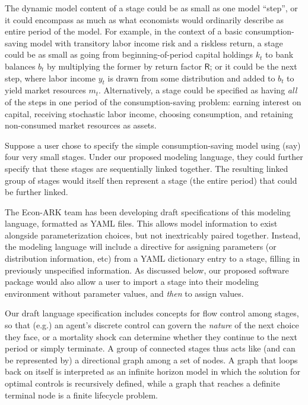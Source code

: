 \documentclass[12pt,pdftex,letterpaper]{article}
\begin{document}
The dynamic model content of a stage could be as small as one model ``step'', or it could encompass as much as what economists would ordinarily describe as entire period of the model. For example, in the context of a basic consumption-saving model with transitory labor income risk and a riskless return, a stage could be as small as going from beginning-of-period capital holdings $k_t$ to bank balances $b_t$ by multiplying the former by return factor $\mathsf{R}$; or it could be the next step, where labor income $y_t$ is drawn from some distribution and added to $b_t$ to yield market resources $m_t$. Alternatively, a stage could be specified as having \textit{all} of the steps in one period of the consumption-saving problem: earning interest on capital, receiving stochastic labor income, choosing consumption, and retaining non-consumed market resources as assets.

Suppose a user chose to specify the simple consumption-saving model using (say) four very small stages. Under our proposed modeling language, they could further specify that these stages are sequentially linked together. The resulting linked group of stages would itself then represent a stage (the entire period) that could be further linked.

The Econ-ARK team has been developing draft specifications of this modeling language, formatted as YAML files. This allows model information to exist alongside parameterization choices, but not inextricably paired together. Instead, the modeling language will include a directive for assigning parameters (or distribution information, etc) from a YAML dictionary entry to a stage, filling in previously unspecified information. As discussed below, our proposed software package would also allow a user to import a stage into their modeling environment without parameter values, and \textit{then} to assign values.

Our draft language specification includes concepts for flow control among stages, so that (e.g.) an agent's discrete control can govern the \textit{nature} of the next choice they face, or a mortality shock can determine whether they continue to the next period or simply terminate. A group of connected stages thus acts like (and can be represented by) a directional graph among a set of nodes. A graph that loops back on itself is interpreted as an infinite horizon model in which the solution for optimal controls is recursively defined, while a graph that reaches a definite terminal node is a finite lifecycle problem.
\end{document}
